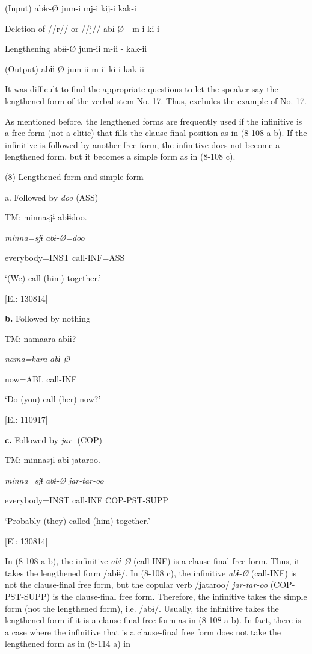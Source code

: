 (Input)  abɨr-Ø  jum-i  mj-i  kij-i  kak-i

Deletion of //r// or //j//  abɨ-Ø  {}-  m-i  ki-i  {}-

Lengthening  abɨɨ-Ø  jum-ii  m-ii  {}-  kak-ii

(Output)  abɨɨ-Ø  jum-ii  m-ii  ki-i  kak-ii

It was difficult to find the appropriate questions to let the speaker say the lengthened form of the verbal stem No. 17. Thus,  excludes the example of No. 17. 

As mentioned before, the lengthened forms are frequently used if the infinitive is a free form (not a clitic) that fills the clause-final position as in (8-108 a-b). If the infinitive is followed by another free form, the infinitive does not become a lengthened form, but it becomes a simple form as in (8-108 c).

(8)  Lengthened form and simple form

  a.  Followed by \textit{doo} (ASS)

    TM:  minnasjɨ  abɨɨdoo.

      \textit{minna=sjɨ}  \textit{abɨ-Ø=doo}

      everybody=INST  call-INF=ASS

      ‘(We) call (him) together.’

      [El: 130814]

  \textbf{b.}  Followed by nothing

    TM:  namaara  abɨɨ?  

      \textit{nama=kara}  \textit{abɨ{}-Ø} 

      now=ABL  call-INF  

      ‘Do (you) call (her) now?’

      [El: 110917]

  \textbf{c.}  Followed by \textit{jar-} (COP)

    TM:  minnasjɨ  abɨ  jataroo.

      \textit{minna=sjɨ}  \textit{abɨ-Ø}  \textit{jar-tar-oo}

      everybody=INST  call-INF  COP-PST-SUPP

      ‘Probably (they) called (him) together.’

      [El: 130814]

In (8-108 a-b), the infinitive \textit{abɨ-Ø} (call-INF) is a clause-final free form. Thus, it takes the lengthened form /abɨɨ/. In (8-108 c), the infinitive \textit{abɨ-Ø} (call-INF) is not the clause-final free form, but the copular verb /jataroo/ \textit{jar-tar-oo} (COP-PST-SUPP) is the clause-final free form. Therefore, the infinitive takes the simple form (not the lengthened form), i.e. /abɨ/. Usually, the infinitive takes the lengthened form if it is a clause-final free form as in (8-108 a-b). In fact, there is a case where the infinitive that is a clause-final free form does not take the lengthened form as in (8-114 a) in 

